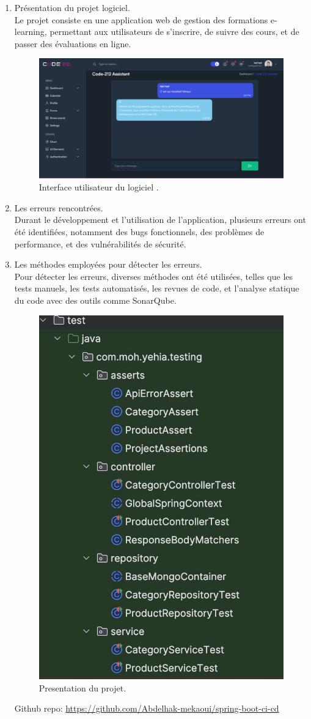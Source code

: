 \documentclass{article}
\begin{document}
\begin{enumerate}
    \item Présentation du projet logiciel. \\
    Le projet consiste en une application web de gestion des formations e-learning, permettant aux utilisateurs de s’inscrire, de suivre des cours, et de passer des évaluations en ligne.
    \begin{figure}[H]
    \centering
    \includegraphics[width=0.8\linewidth]{assets/Screenshot 2024-12-15 192310.png}
    \caption{\label{fig:frog1}Interface utilisateur du logiciel .}
    \end{figure}

    \item Les erreurs rencontrées. \\
    Durant le développement et l'utilisation de l'application, plusieurs erreurs ont été identifiées, notamment des bugs fonctionnels, des problèmes de performance, et des vulnérabilités de sécurité.

    \item Les méthodes employées pour détecter les erreurs. \\
    Pour détecter les erreurs, diverses méthodes ont été utilisées, telles que les tests manuels, les tests automatisés, les revues de code, et l'analyse statique du code avec des outils comme SonarQube.
    \begin{figure}[H]
      \centering
      \includegraphics[width=0.5\linewidth]{assets/IMG-20241214-WA0001.jpg}
      \caption{\label{fig:froga1}Presentation du projet.}
      \end{figure}
      Github repo: \url{https://github.com/Abdelhak-mekaoui/spring-boot-ci-cd}

\end{enumerate}
\end{document}
